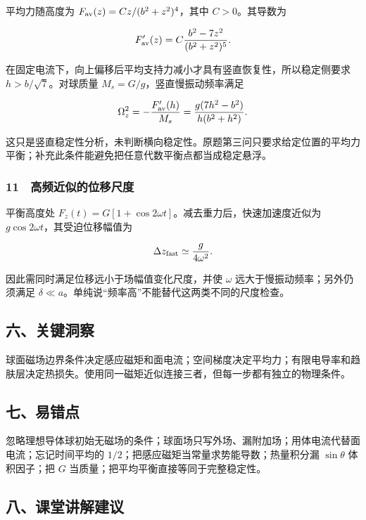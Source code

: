 \documentclass[12pt,a4paper,fontset=fandol]{ctexart}
\begin{document}
平均力随高度为 \(F_{\rm av}(z)=Cz/(b^2+z^2)^4\)，其中 \(C>0\)。其导数为

\[F'_{\rm av}(z)=C\frac{b^2-7z^2}{(b^2+z^2)^5}.\]

在固定电流下，向上偏移后平均支持力减小才具有竖直恢复性，所以稳定侧要求
\(h>b/\sqrt7\)。对球质量 \(M_s=G/g\)，竖直慢振动频率满足

\[\Omega_z^2=-\frac{F'_{\rm av}(h)}{M_s}
=\frac{g(7h^2-b^2)}{h(b^2+h^2)}.\]

这只是竖直稳定性分析，未判断横向稳定性。原题第三问只要求给定位置的平均力平衡；补充此条件能避免把任意代数平衡点都当成稳定悬浮。

\subsubsection{11　高频近似的位移尺度}\label{ux9ad8ux9891ux8fd1ux4f3cux7684ux4f4dux79fbux5c3aux5ea6}

平衡高度处 \(F_z(t)=G[1+\cos2\omega t]\)。减去重力后，快速加速度近似为
\(g\cos2\omega t\)，其受迫位移幅值为

\[\Delta z_{\rm fast}\simeq\frac g{4\omega^2}.\]

因此需同时满足位移远小于场幅值变化尺度，并使 \(\omega\)
远大于慢振动频率；另外仍须满足
\(\delta\ll a\)。单纯说``频率高''不能替代这两类不同的尺度检查。

\subsection{六、关键洞察}\label{ux516dux5173ux952eux6d1eux5bdf-5}

球面磁场边界条件决定感应磁矩和面电流；空间梯度决定平均力；有限电导率和趋肤层决定热损失。使用同一磁矩近似连接三者，但每一步都有独立的物理条件。

\subsection{七、易错点}\label{ux4e03ux6613ux9519ux70b9-5}

忽略理想导体球初始无磁场的条件；球面场只写外场、漏附加场；用体电流代替面电流；忘记时间平均的
\(1/2\)；把感应磁矩当常量求势能导数；热量积分漏 \(\sin\theta\)
体积因子；把 \(G\) 当质量；把平均平衡直接等同于完整稳定性。

\subsection{八、课堂讲解建议}\label{ux516bux8bfeux5802ux8bb2ux89e3ux5efaux8bae-5}
\end{document}
